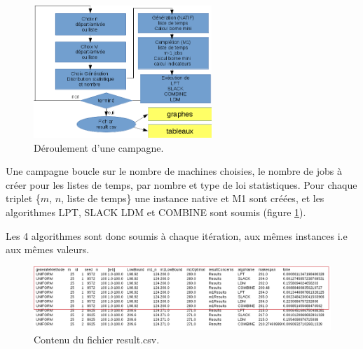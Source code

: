 \documentclass[a4paper,12pt]{report}
\theoremstyle{plain}				%
\theoremstyle{definition}				%
\begin{document}
\begin{figure}
{\centering
\includegraphics[height=50mm]{derouleCampagne.png}
\caption{Déroulement d'une campagne.}
\label{fig:deroulementDUneCampagne}
\par}
\end{figure}

Une campagne boucle sur le nombre de machines choisies, le nombre de jobs à créer pour les listes de temps, par nombre et type de loi statistiques. Pour chaque triplet \{$m$, $n$, liste de temps\} une instance native et M1 sont créées, et les algorithmes LPT, SLACK LDM et COMBINE sont soumis (figure \ref{fig:deroulementDUneCampagne}).

Les 4 algorithmes sont donc soumis à chaque itération, aux mêmes instances i.e aux mêmes valeurs. 

\begin{figure}
{\centering
\includegraphics[width=\columnwidth]{contenuResultCSV.png}
\caption{Contenu du fichier result.csv.}
\label{fig:contenuResultCSV}
\par}
\end{figure}
\end{document}
